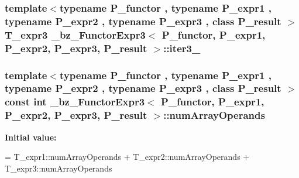 \subsubsection[{iter3\+\_\+}]{\setlength{\rightskip}{0pt plus 5cm}template$<$typename P\+\_\+functor , typename P\+\_\+expr1 , typename P\+\_\+expr2 , typename P\+\_\+expr3 , class P\+\_\+result $>$ {\bf T\+\_\+expr3} {\bf \+\_\+bz\+\_\+\+Functor\+Expr3}$<$ P\+\_\+functor, P\+\_\+expr1, P\+\_\+expr2, P\+\_\+expr3, P\+\_\+result $>$\+::iter3\+\_\+\hspace{0.3cm}{\ttfamily [protected]}}\label{class__bz__FunctorExpr3_a27cdce9902cc1b453b91d1488d0ebbc8}
\hypertarget{class__bz__FunctorExpr3_aa4e099a13edfc8d133cc042f15cadc39}{}
\subsubsection[{num\+Array\+Operands}]{\setlength{\rightskip}{0pt plus 5cm}template$<$typename P\+\_\+functor , typename P\+\_\+expr1 , typename P\+\_\+expr2 , typename P\+\_\+expr3 , class P\+\_\+result $>$ const int {\bf \+\_\+bz\+\_\+\+Functor\+Expr3}$<$ P\+\_\+functor, P\+\_\+expr1, P\+\_\+expr2, P\+\_\+expr3, P\+\_\+result $>$\+::num\+Array\+Operands\hspace{0.3cm}{\ttfamily [static]}}\label{class__bz__FunctorExpr3_aa4e099a13edfc8d133cc042f15cadc39}
{\bfseries Initial value\+:}
\begin{DoxyCode}
= T\_expr1::numArrayOperands
                         + T\_expr2::numArrayOperands
                         + T\_expr3::numArrayOperands
\end{DoxyCode}
\hypertarget{class__bz__FunctorExpr3_a629b44040bfa7c287de36ccaf4a271ad}{}
